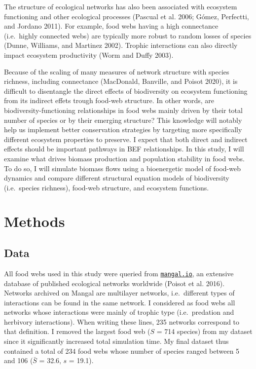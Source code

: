\documentclass[11pt]{article}
\begin{document}
The structure of ecological networks has also been associated with
ecosystem functioning and other ecological processes (Pascual et al.
2006; Gómez, Perfectti, and Jordano 2011). For example, food webs having
a high connectance (i.e.~highly connected webs) are typically more
robust to random losses of species (Dunne, Williams, and Martinez 2002).
Trophic interactions can also directly impact ecosystem productivity
(Worm and Duffy 2003).

Because of the scaling of many measures of network structure with
species richness, including connectance (MacDonald, Banville, and Poisot
2020), it is difficult to disentangle the direct effects of biodiversity
on ecosystem functioning from its indirect effets trough food-web
structure. In other words, are biodiversity-functioning relationships in
food webs mainly driven by their total number of species or by their
emerging structure? This knowledge will notably help us implement better
conservation strategies by targeting more specifically different
ecosystem properties to preserve. I expect that both direct and indirect
effects should be important pathways in BEF relationships. In this
study, I will examine what drives biomass production and population
stability in food webs. To do so, I will simulate biomass flows using a
bioenergetic model of food-web dynamics and compare different structural
equation models of biodiversity (i.e.~species richness), food-web
structure, and ecosystem functions.

\hypertarget{methods}{%
\section{Methods}\label{methods}}

\hypertarget{data}{%
\subsection{Data}\label{data}}

All food webs used in this study were queried from
\href{https://mangal.io/\#/}{\texttt{mangal.io}}, an extensive database
of published ecological networks worldwide (Poisot et al. 2016).
Networks archived on Mangal are multilayer networks, i.e.~different
types of interactions can be found in the same network. I considered as
food webs all networks whose interactions were mainly of trophic type
(i.e.~predation and herbivory interactions). When writing these lines,
235 networks correspond to that definition. I removed the largest food
web (\(S\) = 714 species) from my dataset since it significantly
increased total simulation time. My final dataset thus contained a total
of 234 food webs whose number of species ranged between 5 and 106
(\(\bar{S}\) = 32.6, \(s\) = 19.1).
\end{document}

